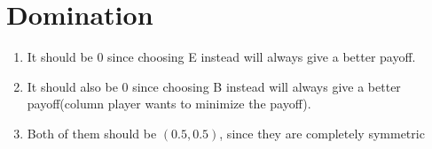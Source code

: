 \documentclass[11pt]{article}
\newenvironment{qparts}{\begin{enumerate}[{(}a{)}]}{\end{enumerate}}
\begin{document}
\newpage
\section{Domination}
\begin{qparts}
	\item 
	
	It should be 0 since choosing E instead will always give a better payoff.
	
	\item
	
	It should also be 0 since choosing B instead will always give a better payoff(column player wants to minimize the payoff).
	
	\item
	
	Both of them should be $(0.5, 0.5)$, since they are completely symmetric
	
\end{qparts}
\end{document}
